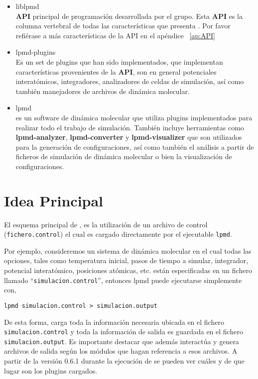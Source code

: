 \begin{itemize}
 \item liblpmd \\
\textbf{API} principal de programaci\'on desarrollada por el grupo. Esta \textbf{API} es la columna vertebral de todas las caracter\'isticas que presenta {\lpmd}. Por favor refi\'erase a m\'as caracter\'isticas de la API en el ap\'endice ~\ref{ap:API}
 \item lpmd-plugins \\
Es un set de plugins que han sido implementados, que implementan caracter\'isticas provenientes de la \textbf{API}, son en general potenciales interat\'omicos, integradores, analizadores de celdas de simulaci\'on, as\'i como tambi\'en manejadores de archivos de din\'amica molecular.
 \item lpmd \\
{\lpmd} es un software de din\'amica molecular que utiliza plugins implementados para realizar todo el trabajo de simulaci\'on. Tambi\'en incluye herramientas como \textbf{lpmd-analyzer}, \textbf{lpmd-converter} y \textbf{lpmd-visualizer} que son utilizados para la generaci\'on de configuraciones, as\'i como tambi\'en el an\'alisis a partir de ficheros de simulaci\'on de din\'amica molecular o bien la visualizaci\'on de configuraciones.
\end{itemize}

\section{Idea Principal}

El esquema principal de {\lpmd}, es la utilizaci\'on de un archivo de control (\verb|fichero.control|) el cual es cargado directamente por el ejecutable \verb|lpmd|.

Por ejemplo, consideremos un sistema de din\'amica molecular en el cual todas las opciones, tales como temperatura inicial, pasos de tiempo a simular, integrador, potencial interat\'omico, posiciones at\'omicas, etc. est\'an especificadas en un fichero llamado ``\verb|simulacion.control|'', entonces lpmd puede ejecutarse simplemente con,

\begin{center}
 \texttt{lpmd simulacion.control > simulacion.output}
\end{center}
\noindent

De esta forma, {\lpmd} carga toda la informaci\'on necesaria ubicada en el fichero \verb|simulacion.control| y toda la informaci\'on de salida es guardada en el fichero \verb|simulacion.output|. Es importante destacar que {\lpmd} adem\'as interact\'ua y genera archivos de salida seg\'un los m\'odulos que hagan referencia a esos archivos. A partir de la versi\'on 0.6.1 durante la ejecuci\'on de {\lpmd} se pueden ver cu\'ales y de que lugar son los plugins cargados.

